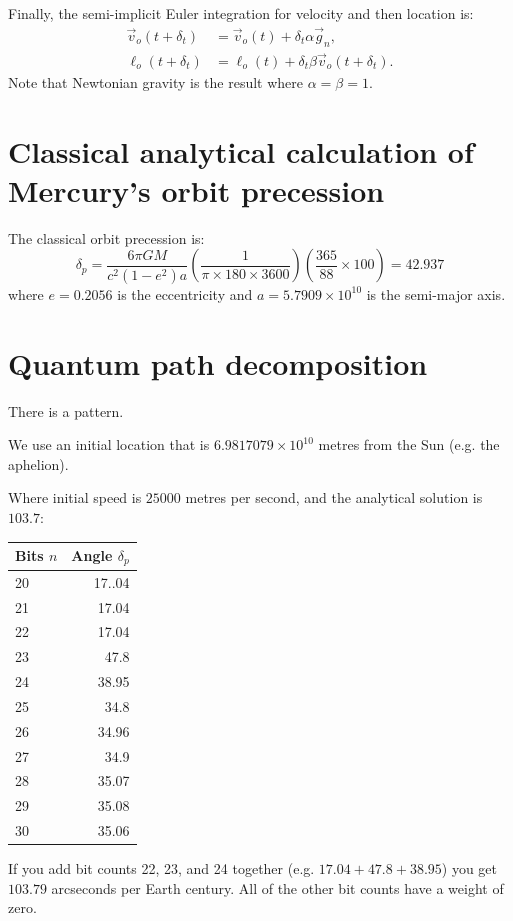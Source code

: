 \documentclass[12pt]{article}
\begin{document}
Finally, the semi-implicit Euler integration for velocity and then location is:
\begin{align}
\label{eq_velocity}
\vec{v}_{o}(t + \delta_t) &= \vec{v}_{o}(t) + \delta_{t} \alpha \vec{g}_n, \\
\label{eq_position}
\ell_{o}(t + \delta_t) &= \ell_{o}(t) + \delta_{t} \beta \vec{v}_{o}(t + \delta_t).
\end{align}
Note that Newtonian gravity is the result where $\alpha = \beta = 1$.







\section{Classical analytical calculation of Mercury's orbit precession}

The classical orbit precession is:
\begin{equation}
\label{delta_p}
\delta_{p} = \frac{6 \pi G M}{c^2 (1 - e^2) a} \left( \frac{1}{ \pi \times 180 \times 3600} \right) \left( \frac{365}{88} \times 100 \right) = 42.937
\end{equation}
where $e = 0.2056$ is the eccentricity and $a = 5.7909 \times 10^{10}$ is the semi-major axis.




\section{Quantum path decomposition}

There is a pattern.

We use an initial location that is $6.9817079 \times 10^{10}$ metres from the Sun (e.g. the aphelion).

Where initial speed is $25000$ metres per second, and the analytical solution is $103.7$:
\begin{center}
\begin{tabular}{| l | r |}
  \hline
Bits $n$ & Angle $\delta_{p}$ \\
\hline
\hline
20 & 17..04 \\
21 & 17.04 \\
22 & 17.04 \\
23 & 47.8 \\
24 & 38.95 \\
25 & 34.8 \\
26 & 34.96 \\
27 & 34.9 \\
28 & 35.07 \\
29 & 35.08 \\
30 & 35.06 \\
  \hline  
\end{tabular}
\end{center}
If you add bit counts 22, 23, and 24 together (e.g. $17.04 + 47.8 + 38.95$) you get $103.79$ arcseconds per Earth century.
All of the other bit counts have a weight of zero.
\end{document}
